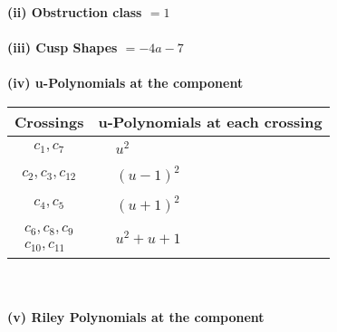 \documentclass[1p]{elsarticle_modified}
\theoremstyle{definition}
\begin{document}
\flushleft \textbf{(ii) Obstruction class $= 1$}\\~\\
\flushleft \textbf{(iii) Cusp Shapes $= -4 a-7$}\\~\\
\newpage\renewcommand{\arraystretch}{1}
\flushleft \textbf{(iv) u-Polynomials at the component}\newline \\
\begin{tabular}{m{50pt}|m{274pt}}
Crossings & \hspace{64pt}u-Polynomials at each crossing \\
\hline $$\begin{aligned}c_{1},c_{7}\end{aligned}$$&$\begin{aligned}
&u^2
\end{aligned}$\\
\hline $$\begin{aligned}c_{2},c_{3},c_{12}\end{aligned}$$&$\begin{aligned}
&(u-1)^2
\end{aligned}$\\
\hline $$\begin{aligned}c_{4},c_{5}\end{aligned}$$&$\begin{aligned}
&(u+1)^2
\end{aligned}$\\
\hline $$\begin{aligned}c_{6},c_{8},c_{9}\\c_{10},c_{11}\end{aligned}$$&$\begin{aligned}
&u^2+u+1
\end{aligned}$\\
\hline
\end{tabular}\\~\\
\newpage\renewcommand{\arraystretch}{1}
\flushleft \textbf{(v) Riley Polynomials at the component}\newline \\
\end{document}
